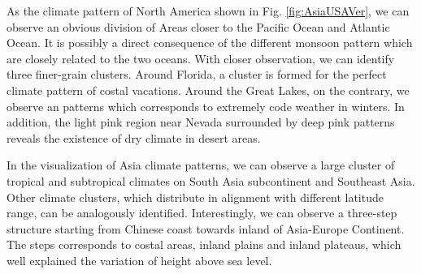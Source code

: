 As the climate pattern of North America shown in Fig. \ref{fig:AsiaUSAVer}, we can observe an obvious division of Areas closer to the Pacific Ocean and Atlantic Ocean. It is possibly a direct consequence of the different monsoon pattern which are closely related to the two oceans. With closer observation, we can identify three finer-grain clusters. Around Florida, a cluster is formed for the perfect climate pattern of costal vacations. Around the Great Lakes, on the contrary, we observe an patterns which corresponds to extremely code weather in winters. In addition, the light pink region near Nevada surrounded by deep pink patterns reveals the existence of dry climate in desert areas.

In the visualization of Asia climate patterns, we can observe a large cluster of tropical and subtropical climates on South Asia subcontinent and Southeast Asia. Other climate clusters, which distribute in alignment with different latitude range, can be analogously identified. Interestingly, we can observe a three-step structure starting from Chinese coast towards inland of Asia-Europe Continent. The steps corresponds to costal areas, inland plains and inland plateaus, which well explained the variation of height above sea level.



